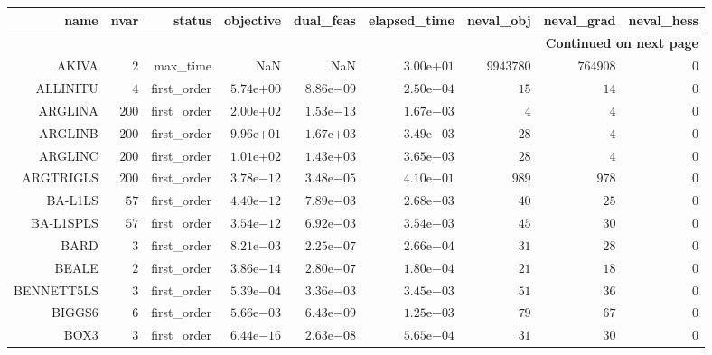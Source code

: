 \begin{longtable}{rrrrrrrrr}
\hline
name & nvar & status & objective & dual\_feas & elapsed\_time & neval\_obj & neval\_grad & neval\_hess \\\hline
\endhead
\hline
\multicolumn{9}{r}{{\bfseries Continued on next page}}\\
\hline
\endfoot
\endlastfoot
AKIVA & \(     2\) & max\_time &       NaN &       NaN & \( 3.00\)e\(+01\) & \(9943780\) & \(764908\) & \(     0\) \\
ALLINITU & \(     4\) & first\_order & \( 5.74\)e\(+00\) & \( 8.86\)e\(-09\) & \( 2.50\)e\(-04\) & \(    15\) & \(    14\) & \(     0\) \\
ARGLINA & \(   200\) & first\_order & \( 2.00\)e\(+02\) & \( 1.53\)e\(-13\) & \( 1.67\)e\(-03\) & \(     4\) & \(     4\) & \(     0\) \\
ARGLINB & \(   200\) & first\_order & \( 9.96\)e\(+01\) & \( 1.67\)e\(+03\) & \( 3.49\)e\(-03\) & \(    28\) & \(     4\) & \(     0\) \\
ARGLINC & \(   200\) & first\_order & \( 1.01\)e\(+02\) & \( 1.43\)e\(+03\) & \( 3.65\)e\(-03\) & \(    28\) & \(     4\) & \(     0\) \\
ARGTRIGLS & \(   200\) & first\_order & \( 3.78\)e\(-12\) & \( 3.48\)e\(-05\) & \( 4.10\)e\(-01\) & \(   989\) & \(   978\) & \(     0\) \\
BA-L1LS & \(    57\) & first\_order & \( 4.40\)e\(-12\) & \( 7.89\)e\(-03\) & \( 2.68\)e\(-03\) & \(    40\) & \(    25\) & \(     0\) \\
BA-L1SPLS & \(    57\) & first\_order & \( 3.54\)e\(-12\) & \( 6.92\)e\(-03\) & \( 3.54\)e\(-03\) & \(    45\) & \(    30\) & \(     0\) \\
BARD & \(     3\) & first\_order & \( 8.21\)e\(-03\) & \( 2.25\)e\(-07\) & \( 2.66\)e\(-04\) & \(    31\) & \(    28\) & \(     0\) \\
BEALE & \(     2\) & first\_order & \( 3.86\)e\(-14\) & \( 2.80\)e\(-07\) & \( 1.80\)e\(-04\) & \(    21\) & \(    18\) & \(     0\) \\
BENNETT5LS & \(     3\) & first\_order & \( 5.39\)e\(-04\) & \( 3.36\)e\(-03\) & \( 3.45\)e\(-03\) & \(    51\) & \(    36\) & \(     0\) \\
BIGGS6 & \(     6\) & first\_order & \( 5.66\)e\(-03\) & \( 6.43\)e\(-09\) & \( 1.25\)e\(-03\) & \(    79\) & \(    67\) & \(     0\) \\
BOX3 & \(     3\) & first\_order & \( 6.44\)e\(-16\) & \( 2.63\)e\(-08\) & \( 5.65\)e\(-04\) & \(    31\) & \(    30\) & \(     0\) \\

\end{longtable}
